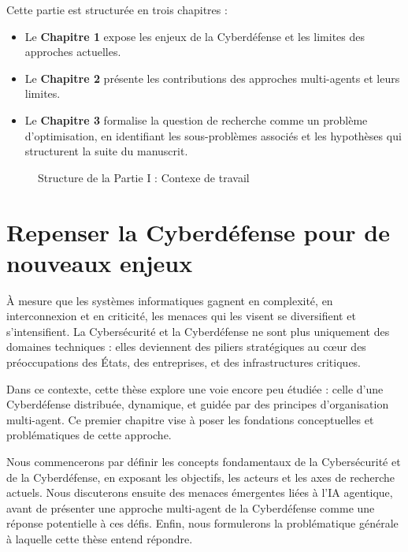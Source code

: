 \vspace{1em}

Cette partie est structurée en trois chapitres :
\begin{itemize}
    \item Le \textbf{Chapitre 1} expose les enjeux de la Cyberdéfense et les limites des approches actuelles.
    \item Le \textbf{Chapitre 2} présente les contributions des approches multi-agents et leurs limites.
    \item Le \textbf{Chapitre 3} formalise la question de recherche comme un problème d'optimisation, en identifiant les sous-problèmes associés et les hypothèses qui structurent la suite du manuscrit.
\end{itemize}
\clearpage

\begin{figure}[h!]
    \centering
    \resizebox{\textwidth}{!}{%
        
    }
    \caption{Structure de la Partie I : Contexe de travail}
    \label{fig:organisation_manuscrit_partie_1}
\end{figure}


\chapter{Repenser la Cyberdéfense pour de nouveaux enjeux}

\noindent
À mesure que les systèmes informatiques gagnent en complexité, en interconnexion et en criticité, les menaces qui les visent se diversifient et s'intensifient. La Cybersécurité et la Cyberdéfense ne sont plus uniquement des domaines techniques : elles deviennent des piliers stratégiques au cœur des préoccupations des États, des entreprises, et des infrastructures critiques.

Dans ce contexte, cette thèse explore une voie encore peu étudiée : celle d'une Cyberdéfense distribuée, dynamique, et guidée par des principes d'organisation multi-agent. Ce premier chapitre vise à poser les fondations conceptuelles et problématiques de cette approche.

Nous commencerons par définir les concepts fondamentaux de la Cybersécurité et de la Cyberdéfense, en exposant les objectifs, les acteurs et les axes de recherche actuels. Nous discuterons ensuite des menaces émergentes liées à l'\ac{IA} agentique, avant de présenter une approche multi-agent de la Cyberdéfense comme une réponse potentielle à ces défis. Enfin, nous formulerons la problématique générale à laquelle cette thèse entend répondre.

